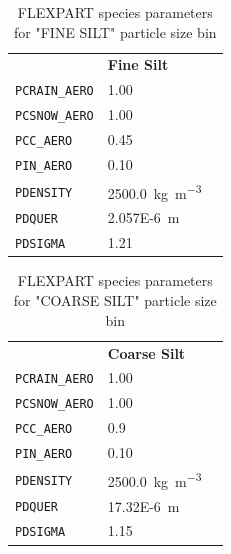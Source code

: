 \begin{table}[htpb]
\centering
\begin{tabular}{lll}
 & \textbf{Fine Silt} & \\
\rowcolor[HTML]{EFEFEF} 
 \verb|PCRAIN_AERO|& 1.00  \\
 \verb|PCSNOW_AERO|& 1.00  \\
\rowcolor[HTML]{EFEFEF} 
 \verb|PCC_AERO|& 0.45 \parencite{flexdust_ref_2016}  \\
 \verb|PIN_AERO|& 0.10 \parencite{flexdust_ref_2016}  \\
\rowcolor[HTML]{EFEFEF} 
 \verb|PDENSITY|& \SI{2500.0}{\kg\per\cubic\metre}   \\
 \verb|PDQUER|& \SI{2.057E-6}{\metre}   \\
\rowcolor[HTML]{EFEFEF} 
 \verb|PDSIGMA|&1.21   
\end{tabular}

\caption{FLEXPART species parameters for "FINE SILT" particle size bin}
\label{Table_species_fine_silt}
\end{table}

\begin{table}[htpb]
\centering
\begin{tabular}{lll}
 & \textbf{Coarse Silt} & \\
\rowcolor[HTML]{EFEFEF} 
 \verb|PCRAIN_AERO|& 1.00  \\
 \verb|PCSNOW_AERO|& 1.00  \\
\rowcolor[HTML]{EFEFEF} 
 \verb|PCC_AERO|& 0.9 \parencite{flexdust_ref_2016}  \\
 \verb|PIN_AERO|& 0.10 \parencite{flexdust_ref_2016}  \\
\rowcolor[HTML]{EFEFEF} 
 \verb|PDENSITY|& \SI{2500.0}{\kg\per\cubic\metre} \\
 \verb|PDQUER|& \SI{17.32E-6}{\metre}   \\
\rowcolor[HTML]{EFEFEF} 
 \verb|PDSIGMA|&1.15   
\end{tabular}
\caption{FLEXPART species parameters for "COARSE SILT" particle size bin}
\label{Table_species_coaurse}
\end{table}

